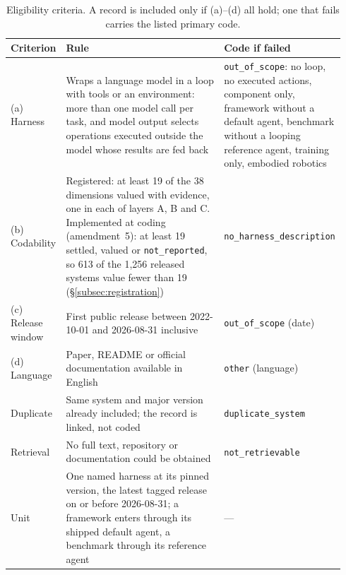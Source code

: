 \begin{table}[t]
  \footnotesize
  \caption{Eligibility criteria. A record is included only if (a)--(d) all hold; one that fails carries
  the listed primary code.}
  \label{tab:eligibility}
  \begin{tabular}{@{}p{0.15\linewidth} p{0.53\linewidth} p{0.26\linewidth}@{}}
    \toprule
    Criterion & Rule & Code if failed \\
    \midrule
    (a) Harness & Wraps a language model in a loop with tools or an environment: more than one model call
      per task, and model output selects operations executed outside the model whose results are fed back
      & \texttt{out\_of\_scope}: no loop, no executed actions, component only, framework without a default
      agent, benchmark without a looping reference agent, training only, embodied robotics \\
    (b) Codability & Registered: at least 19 of the 38 dimensions valued with evidence, one in each of
      layers A, B and C. Implemented at coding (amendment~5): at least 19 settled, valued or
      \texttt{not\_reported}, so 613 of the 1,256 released systems value fewer than 19
      (\S\ref{subsec:registration}) & \texttt{no\_harness\_description} \\
    (c) Release window & First public release between 2022-10-01 and 2026-08-31 inclusive &
      \texttt{out\_of\_scope} (date) \\
    (d) Language & Paper, README or official documentation available in English & \texttt{other}
      (language) \\
    \midrule
    Duplicate & Same system and major version already included; the record is linked, not coded &
      \texttt{duplicate\_system} \\
    Retrieval & No full text, repository or documentation could be obtained & \texttt{not\_retrievable} \\
    \midrule
    Unit & One named harness at its pinned version, the latest tagged release on or before 2026-08-31; a
      framework enters through its shipped default agent, a benchmark through its reference agent & --- \\
    \bottomrule
  \end{tabular}
\end{table}

